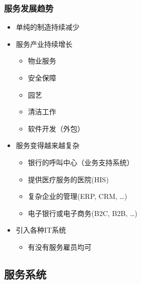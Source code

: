 \begin{figure}[H]
{\begin{minipage}[c]{0.25\linewidth}
	\end{minipage}
	}
	\centering
	\vspace{-1em}
\end{figure}

\subsubsection{服务发展趋势}
\vspace{-0.8em}
\begin{multicols}{2}
    \begin{itemize}
        \item 单纯的制造持续减少
        \item 服务产业持续增长
        \vspace{-0.8em}
        \begin{multicols}{3}
            \begin{itemize}
                \item 物业服务
                \item 安全保障
                \item 园艺
                \item 清洁工作
                \item 软件开发（外包）
            \end{itemize}
        \end{multicols}
        \vspace{-1.2em}
        \item 服务变得越来越复杂
        \begin{itemize}
            \item 银行的呼叫中心（业务支持系统）
            \item 提供医疗服务的医院(HIS)
            \item 复杂企业的管理(ERP, CRM, …)
            \item 电子银行或电子商务(B2C, B2B, …)
        \end{itemize}
        \item 引入各种IT系统
        \begin{itemize}
            \item 有没有服务雇员均可
        \end{itemize}
    \end{itemize}
\end{multicols}
\vspace{-1em}


\subsection{服务系统}

